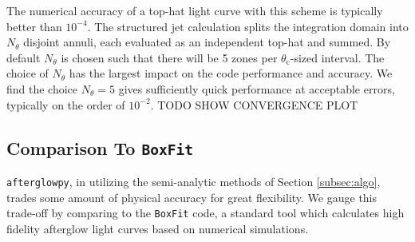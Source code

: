 \documentclass[twocolumn]{aastex62}
\newcommand{\afterglowpy}{{\tt afterglowpy}}
\newcommand{\boxfit}{{\tt BoxFit}}
\newcommand{\thobs}{\ensuremath{\theta_{\mathrm{obs}}}}
\newcommand{\thC}{\ensuremath{\theta_{\mathrm{c}}}}
\newcommand{\epse}{\ensuremath{\varepsilon_{\mathrm{e}}}}
\newcommand{\epsB}{\ensuremath{\varepsilon_{\mathrm{B}}}}
\newcommand{\dL}{\ensuremath{d_{\mathrm{L}}}}
\newcommand{\Eiso}{\ensuremath{E_{\mathrm{iso}}}}
\begin{document}
The numerical accuracy of a top-hat light curve with this scheme is typically better than $10^{-4}$.  The structured jet calculation splits the integration domain into $N_\theta$ disjoint annuli, each evaluated as an independent top-hat and summed.  By default $N_\theta$ is chosen such that there will be 5 zones per $\thC$-sized interval.   The choice of $N_\theta$ has the largest impact on the code performance and accuracy.  We find the choice $N_\theta = 5$ gives sufficiently quick performance at acceptable errors, typically on the order of $10^{-2}$.  TODO SHOW CONVERGENCE PLOT


\subsection{Comparison To \boxfit{}} \label{subsec:boxfitcomp}

\afterglowpy{}, in utilizing the semi-analytic methods of Section \ref{subsec:algo}, trades some amount of physical accuracy for great flexibility.  We gauge this trade-off by comparing to the \boxfit{} code, a standard tool which calculates high fidelity afterglow light curves based on numerical simulations.  

%
\begin{figure*}
	\caption{Top Panel: Comparison between top hat jet light curves from \afterglowpy{} (solid lines) and \boxfit{} (dashed lines). Bottom Panel: fraction difference between \afterglowpy{} and \boxfit{} light curves.  Four representative light curves are shown: radio on-axis ($\thobs=0$, $\nu=10^9$Hz, blue), radio off-axis ($\thobs=0.16$rad, $\nu=10^9$Hz, orange), x-ray on-axis ($\thobs=0$, $\nu=10^{18}$Hz, green), and x-ray off-axis ($\thobs=0.16$rad, $\nu=10^{18}$Hz, red).  Remaining parameters are shared: $\thC=0.1$rad, $\Eiso=10^{52}$erg, $\Eiso=10^{52}$erg, $n_0 = 10^{-3}$cm$^{-3}$, $p=2.2$, $\epse=10^{-1}$, $\epsB=10^{-2}$, $\dL=3.09 \times 10^{26}$cm, $z=0.028$. \label{fig:boxfitComp}}
\end{figure*}
\end{document}
